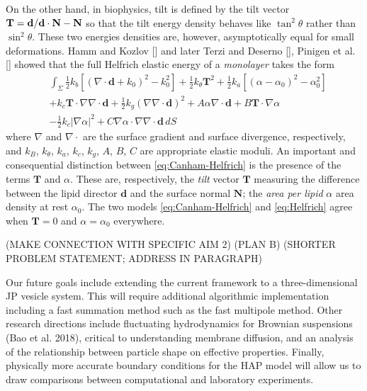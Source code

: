 On the other hand, in biophysics, tilt is defined by the tilt vector
  $\mathbf{T} = \mathbf{d}/\mathbf{d}\cdot \mathbf{N} - \mathbf{N}$ so that the tilt energy density
  behaves like $\tan^2 \theta$ rather than $\sin^2 \theta$.
  These two energies densities are, however, asymptotically equal
  for small deformations.
Hamm and Kozlov [] and later Terzi and Deserno [], Pinigen et al. []
showed that the full Helfrich elastic energy of a \emph{monolayer} takes the form
\begin{equation}
\label{eq:Helfrich}
  \begin{aligned}
 &\int_{\Sigma}
\tfrac{1}{2}k_{b}[(\nabla \cdot \mathbf{d} + k_{0})^{2} -  k^{2}_{0}]  
+ \tfrac{1}{2}k_{\theta}\mathbf{T}^{2} + \tfrac{1}{2}k_a[(\alpha - \alpha_0)^2 - \alpha_0^2] \\
&+ k_{c}\textbf{T} \cdot \nabla \nabla \cdot \mathbf{d}  + \tfrac{1}{2}k_{g}(\nabla \nabla \cdot \mathbf{d})^{2}
 + A\alpha \nabla \cdot \mathbf{d}
+ B \mathbf{T} \cdot \nabla \alpha \\
&- \tfrac{1}{2}k_c |\nabla \alpha|^2 + C \nabla \alpha \cdot \nabla \nabla \cdot \mathbf{d}\,dS
\end{aligned}
\end{equation}
where $\nabla$ and $\nabla \cdot$ are the surface gradient and surface divergence,
respectively, and $k_B$, $k_{\theta}$, $k_a$, $k_c$, $k_g$, $A$, $B$, $C$ are
appropriate elastic moduli.  An important and consequential distinction between
\eqref{eq:Canham-Helfrich} is the presence of the terms $\mathbf{T}$ and $\alpha$.
These are, respectively, the \emph{tilt} vector $\mathbf{T}$ measuring
the difference between the lipid director $\mathbf{d}$ and the surface normal
$\mathbf{N}$; the \emph{area per lipid} $\alpha$ area density at rest $\alpha_0$.
The two models \eqref{eq:Canham-Helfrich} and \eqref{eq:Helfrich} agree
when $\mathbf{T} = 0$ and $\alpha = \alpha_0$ everywhere.

(MAKE CONNECTION WITH SPECIFIC AIM 2)
(PLAN B)
(SHORTER PROBLEM STATEMENT; ADDRESS IN PARAGRAPH)

Our future goals include extending the current framework to a three-dimensional JP vesicle system. This will require additional algorithmic implementation including a fast summation method such as the fast multipole method. Other research directions include fluctuating hydrodynamics for Brownian suspensions (Bao et al. 2018), critical to understanding membrane diffusion, and an analysis of the relationship between particle shape on effective properties. Finally, physically more accurate boundary conditions for the HAP model will allow us to draw comparisons between computational and laboratory experiments.

